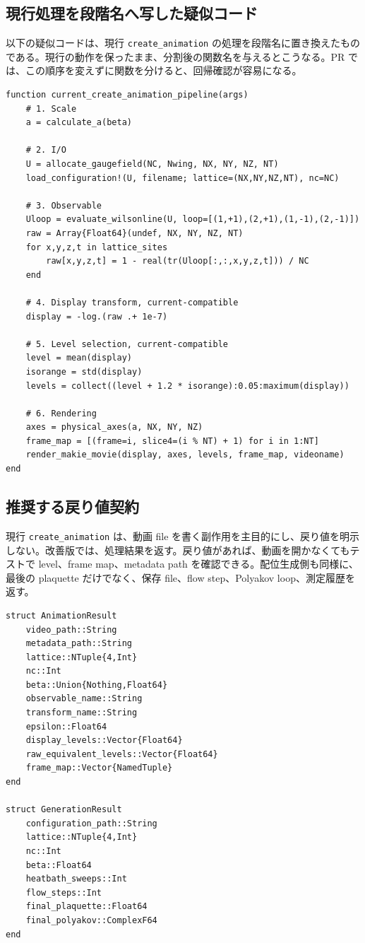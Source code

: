 \documentclass[uplatex,dvipdfmx,ja=standard,11pt,a4paper]{bxjsarticle}
\newcommand{\code}[1]{\texttt{#1}}
\begin{document}
\subsection{現行処理を段階名へ写した疑似コード}
以下の疑似コードは、現行 \code{create\_animation} の処理を段階名に置き換えたものである。現行の動作を保ったまま、分割後の関数名を与えるとこうなる。PR では、この順序を変えずに関数を分けると、回帰確認が容易になる。

\begin{lstlisting}[style=julia,caption={現行 create-animation を段階化した疑似コード}]
function current_create_animation_pipeline(args)
    # 1. Scale
    a = calculate_a(beta)

    # 2. I/O
    U = allocate_gaugefield(NC, Nwing, NX, NY, NZ, NT)
    load_configuration!(U, filename; lattice=(NX,NY,NZ,NT), nc=NC)

    # 3. Observable
    Uloop = evaluate_wilsonline(U, loop=[(1,+1),(2,+1),(1,-1),(2,-1)])
    raw = Array{Float64}(undef, NX, NY, NZ, NT)
    for x,y,z,t in lattice_sites
        raw[x,y,z,t] = 1 - real(tr(Uloop[:,:,x,y,z,t])) / NC
    end

    # 4. Display transform, current-compatible
    display = -log.(raw .+ 1e-7)

    # 5. Level selection, current-compatible
    level = mean(display)
    isorange = std(display)
    levels = collect((level + 1.2 * isorange):0.05:maximum(display))

    # 6. Rendering
    axes = physical_axes(a, NX, NY, NZ)
    frame_map = [(frame=i, slice4=(i % NT) + 1) for i in 1:NT]
    render_makie_movie(display, axes, levels, frame_map, videoname)
end
\end{lstlisting}

\subsection{推奨する戻り値契約}
現行 \code{create\_animation} は、動画 file を書く副作用を主目的にし、戻り値を明示しない。改善版では、処理結果を返す。戻り値があれば、動画を開かなくてもテストで level、frame map、metadata path を確認できる。配位生成側も同様に、最後の plaquette だけでなく、保存 file、flow step、Polyakov loop、測定履歴を返す。

\begin{lstlisting}[style=julia,caption={戻り値契約の型案}]
struct AnimationResult
    video_path::String
    metadata_path::String
    lattice::NTuple{4,Int}
    nc::Int
    beta::Union{Nothing,Float64}
    observable_name::String
    transform_name::String
    epsilon::Float64
    display_levels::Vector{Float64}
    raw_equivalent_levels::Vector{Float64}
    frame_map::Vector{NamedTuple}
end

struct GenerationResult
    configuration_path::String
    lattice::NTuple{4,Int}
    nc::Int
    beta::Float64
    heatbath_sweeps::Int
    flow_steps::Int
    final_plaquette::Float64
    final_polyakov::ComplexF64
end
\end{lstlisting}
\end{document}

